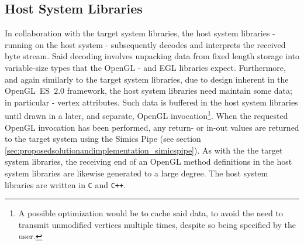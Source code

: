 \subsection{Host System Libraries}
\label{sec:proposedsolutionandimplementation_hostsystemlibraries}
In collaboration with the target system libraries, the host system libraries - running on the host system - subsequently decodes and interprets the received byte stream.
Said decoding involves unpacking data from fixed length storage into variable-size types that the OpenGL - and EGL libraries expect.
Furthermore, and again similarly to the target system libraries, due to design inherent in the OpenGL~ES~$2.0$ framework, the host system libraries need maintain some data; in particular - vertex attributes.
Such data is buffered in the host system libraries until drawn in a later, and separate, OpenGL invocation\footnote{A possible optimization would be to cache said data, to avoid the need to transmit unmodified vertices multiple times, despite so being specified by the user.}.
When the requested OpenGL invocation has been performed, any return- or in-out values are returned to the target system using the Simics Pipe (see section \ref{sec:proposedsolutionandimplementation_simicspipe}).
As with the the target system libraries, the receiving end of an OpenGL method definitions in the host system libraries are likewise generated to a large degree.
The host system libraries are written in \texttt{C} and \texttt{C++}.

